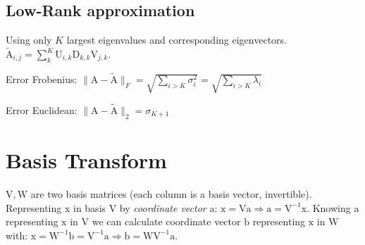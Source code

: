 \documentclass[a4paper, 11pt, landscape]{article}
\newcommand{\matr}[1]{\boldsymbol{\mathrm{#1}}}
\begin{document}
\begin{multicols*}{3}
\subsection{Low-Rank approximation}
Using only $K$ largest eigenvalues and corresponding eigenvectors. $\tilde{\matr{A}}_{i, j} = \sum_{k}^K \matr{U}_{i, k} \matr{D}_{k,k} \matr{V}_{j, k}$.
\begin{compactdesc}
	\item[Error Frobenius:] $\|\matr{A} - \tilde{\matr{A}}\|_F = \sqrt{\sum_{i > K} \sigma_i^2} = \sqrt{\sum_{i > K} \lambda_i}$
	\item[Error Euclidean:] $\|\matr{A} - \tilde{\matr{A}}\|_2 = \sigma_{K+1}$
\end{compactdesc}

\section{Basis Transform}
$\matr{V}, \matr{W}$ are two basis matrices (each column is a basis vector, invertible). Representing $\matr{x}$ in basis $\matr{V}$ by \emph{coordinate vector} $\matr{a}$: $\matr{x} = \matr{V} \matr{a} \Rightarrow \matr{a} = \matr{V}^{-1} \matr{x}$. Knowing $\matr{a}$ representing $\matr{x}$ in $\matr{V}$ we can calculate coordinate vector $\matr{b}$ representing $\matr{x}$ in $\matr{W}$ with: $\matr{x} = \matr{W}^{-1} \matr{b} = \matr{V}^{-1} \matr{a} \Rightarrow \matr{b} = \matr{W} \matr{V}^{-1} \matr{a}$.


\end{multicols*}
\end{document}
